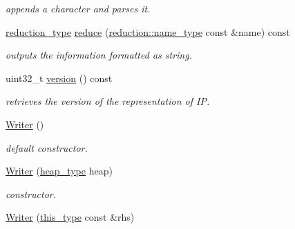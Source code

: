 \begin{DoxyCompactItemize}
\begin{DoxyCompactList}\small\item\em appends a character and parses it. \end{DoxyCompactList}\item 
\hypertarget{classhryky_1_1ip_1_1vf_1_1_writer_a1c62cea2a7239ce4feadf3a6465905a6}{\hyperlink{namespacehryky_a343a9a4c36a586be5c2693156200eadc}{reduction\-\_\-type} \hyperlink{classhryky_1_1ip_1_1vf_1_1_writer_a1c62cea2a7239ce4feadf3a6465905a6}{reduce} (\hyperlink{namespacehryky_1_1reduction_ac686c30a4c8d196bbd0f05629a6b921f}{reduction\-::name\-\_\-type} const \&name) const }\label{classhryky_1_1ip_1_1vf_1_1_writer_a1c62cea2a7239ce4feadf3a6465905a6}

\begin{DoxyCompactList}\small\item\em outputs the information formatted as string. \end{DoxyCompactList}\item 
\hypertarget{classhryky_1_1ip_1_1vf_1_1_writer_ab3774e674780043d14f419e716f180e7}{uint32\-\_\-t \hyperlink{classhryky_1_1ip_1_1vf_1_1_writer_ab3774e674780043d14f419e716f180e7}{version} () const }\label{classhryky_1_1ip_1_1vf_1_1_writer_ab3774e674780043d14f419e716f180e7}

\begin{DoxyCompactList}\small\item\em retrieves the version of the representation of I\-P. \end{DoxyCompactList}\item 
\hypertarget{classhryky_1_1ip_1_1vf_1_1_writer_a519c4ee0ef018fba99e238f745e9c08e}{\hyperlink{classhryky_1_1ip_1_1vf_1_1_writer_a519c4ee0ef018fba99e238f745e9c08e}{Writer} ()}\label{classhryky_1_1ip_1_1vf_1_1_writer_a519c4ee0ef018fba99e238f745e9c08e}

\begin{DoxyCompactList}\small\item\em default constructor. \end{DoxyCompactList}\item 
\hypertarget{classhryky_1_1ip_1_1vf_1_1_writer_a7cfe41344c0a1da4031988f31b9ba54f}{\hyperlink{classhryky_1_1ip_1_1vf_1_1_writer_a7cfe41344c0a1da4031988f31b9ba54f}{Writer} (\hyperlink{classhryky_1_1memory_1_1heap_1_1_base}{heap\-\_\-type} heap)}\label{classhryky_1_1ip_1_1vf_1_1_writer_a7cfe41344c0a1da4031988f31b9ba54f}

\begin{DoxyCompactList}\small\item\em constructor. \end{DoxyCompactList}\item 
\hypertarget{classhryky_1_1ip_1_1vf_1_1_writer_a6aaa9a94b964ea2d7d31c17704d55feb}{\hyperlink{classhryky_1_1ip_1_1vf_1_1_writer_a6aaa9a94b964ea2d7d31c17704d55feb}{Writer} (\hyperlink{classhryky_1_1ip_1_1vf_1_1_writer_aa50e41a90ce5f2371a4fecc1982da520}{this\-\_\-type} const \&rhs)}\label{classhryky_1_1ip_1_1vf_1_1_writer_a6aaa9a94b964ea2d7d31c17704d55feb}


\end{DoxyCompactItemize}
